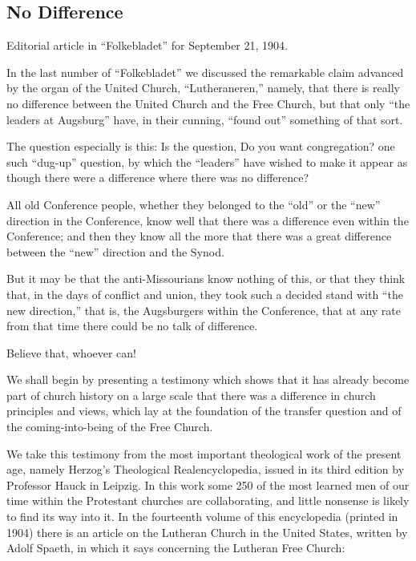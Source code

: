 
\subsection{No Difference}

Editorial article in “Folkebladet” for September 21, 1904.

In the last number of “Folkebladet” we discussed the remarkable claim advanced by the organ of the United Church, “Lutheraneren,” namely, that there is really no difference between the United Church and the Free Church, but that only “the leaders at Augsburg” have, in their cunning, “found out” something of that sort.

The question especially is this: Is the question, Do you want congregation? one such “dug-up” question, by which the “leaders” have wished to make it appear as though there were a difference where there was no difference?

All old Conference people, whether they belonged to the “old” or the “new” direction in the Conference, know well that there was a difference even within the Conference; and then they know all the more that there was a great difference between the “new” direction and the Synod.

But it may be that the anti-Missourians know nothing of this, or that they think that, in the days of conflict and union, they took such a decided stand with “the new direction,” that is, the Augsburgers within the Conference, that at any rate from that time there could be no talk of difference.

Believe that, whoever can!

We shall begin by presenting a testimony which shows that it has already become part of church history on a large scale that there was a difference in church principles and views, which lay at the foundation of the transfer question and of the coming-into-being of the Free Church.

We take this testimony from the most important theological work of the present age, namely Herzog’s Theological Realencyclopedia, issued in its third edition by Professor Hauck in Leipzig. In this work some 250 of the most learned men of our time within the Protestant churches are collaborating, and little nonsense is likely to find its way into it. In the fourteenth volume of this encyclopedia (printed in 1904) there is an article on the Lutheran Church in the United States, written by Adolf Spaeth, in which it says concerning the Lutheran Free Church:

